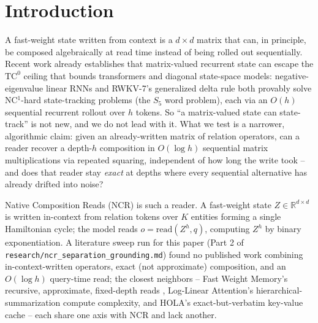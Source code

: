 \section{Introduction}
\label{sec:intro}

A fast-weight state written from context is a $d\times d$ matrix that can,
in principle, be composed algebraically at read time instead of being
rolled out sequentially. Recent work already establishes that
matrix-valued recurrent state can escape the $\mathrm{TC}^0$ ceiling that
bounds transformers and diagonal state-space models: negative-eigenvalue
linear RNNs and RWKV-7's generalized delta rule both provably solve
NC$^1$-hard state-tracking problems (the $S_5$ word problem), each via an
$O(h)$ sequential recurrent rollout over $h$ tokens.
\citep{grazzi2025unlocking,peng2025rwkv7}
So ``a matrix-valued state can state-track'' is not new, and we do not
lead with it. What we test is a narrower, algorithmic claim: given an
already-written matrix of relation operators, can a reader recover a
depth-$h$ composition in $O(\log h)$ sequential matrix multiplications via
repeated squaring, independent of how long the write took -- and does
that reader stay \emph{exact} at depths where every sequential alternative
has already drifted into noise?

Native Composition Reads (NCR) is such a reader. A fast-weight state
$Z \in \mathbb{R}^{d\times d}$ is written in-context from relation tokens
over $K$ entities forming a single Hamiltonian cycle; the model reads
$o = \mathrm{read}(Z^h, q)$, computing $Z^h$ by binary exponentiation. A
literature sweep run for this paper (Part 2 of
\texttt{research/ncr\_separation\_grounding.md}) found no published work
combining in-context-written operators, exact (not approximate)
composition, and an $O(\log h)$ query-time read; the closest neighbors --
Fast Weight Memory's recursive, approximate, fixed-depth reads
\citep{schlag2021fwm}, Log-Linear Attention's hierarchical-summarization
compute complexity, and HOLA's exact-but-verbatim key-value cache -- each
share one axis with NCR and lack another.

